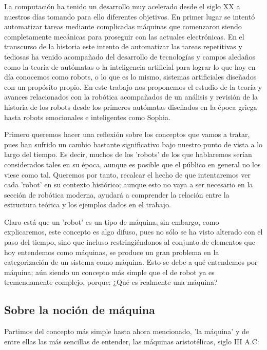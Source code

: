 
La computación ha tenido un desarrollo muy acelerado desde el siglo XX a nuestros días tomando para ello diferentes objetivos. En primer lugar se intentó automatizar tareas mediante complicadas máquinas que comenzaron siendo completamente mecánicas para proseguir con las actuales electrónicas. En el transcurso de la historia este intento de automatizar las tareas repetitivas y tediosas ha venido acompañado del desarrollo de tecnologías y campos aledaños como la teoría de autómatas o la inteligencia artificial para lograr lo que hoy en día conocemos como robots, o lo que es lo mismo, sistemas artificiales diseñados con un propósito propio. En este trabajo nos proponemos el estudio de la teoría y avances relacionados con la robótica acompañados de un análisis y revisión de la historia de los robots desde los primeros autómatas diseñados en la época griega hasta robots emocionales e inteligentes como Sophia.

\vspace{10px}


Primero queremos hacer una reflexión sobre los conceptos que vamos a tratar, pues han sufrido un cambio bastante significativo bajo nuestro punto de vista a lo largo del tiempo. Es decir, muchos de los 'robots' de los que hablaremos serían considerados tales en su época, aunque es posible que el público en general no los viese como tal. Queremos por tanto, recalcar el hecho de que intentaremos ver cada 'robot' en su contexto histórico; aunque esto no vaya a ser necesario en la sección de robótica moderna, ayudará a comprender la relación entre la estructura teórica y los ejemplos dados en el trabajo.

\vspace{10px}

Claro está que un 'robot' es un tipo de máquina, sin embargo, como explicaremos, este concepto es algo difuso, pues no sólo se ha visto alterado con el paso del tiempo, sino que incluso restringiéndonos  al conjunto de elementos que hoy entendemos como máquinas, se produce un gran problema en la categorización de un sistema como máquina. Esto se debe a qué entendemos por máquina; aún siendo un concepto más simple que el de robot ya es tremendamente complejo, porque: ¿Qué es realmente una máquina?

\subsection{Sobre la noción de máquina}


Partimos del concepto más simple hasta ahora mencionado, 'la máquina' y de entre ellas las más sencillas de entender, las máquinas aristotélicas, siglo III A.C: \\

